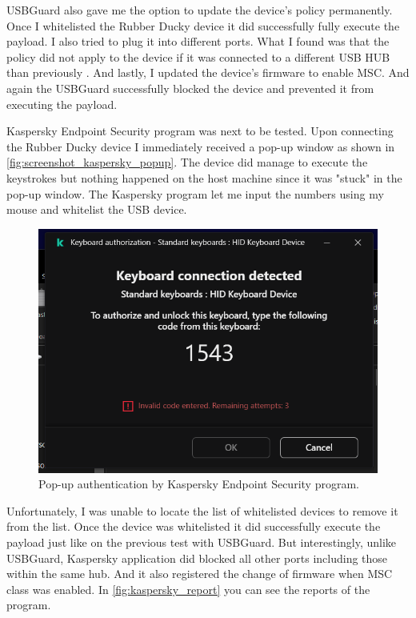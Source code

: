 USBGuard also gave me the option to update the device's policy permanently. Once I whitelisted the Rubber Ducky device it did successfully fully execute the payload. I also tried to plug it into different ports. What I found was that the policy did not apply to the device if it was connected to a different USB HUB than previously . And lastly, I updated the device's firmware to enable MSC. And again the USBGuard successfully blocked the device and prevented it from executing the payload.

Kaspersky Endpoint Security program was next to be tested. Upon connecting the Rubber Ducky device I immediately received a pop-up window as shown in \autoref{fig:screenshot_kaspersky_popup}. The device did manage to execute the keystrokes but nothing happened on the host machine since it was "stuck" in the pop-up window. The Kaspersky program let me input the numbers using my mouse and whitelist the USB device.
\begin{figure}[ht]
    \centering
    \includegraphics[width=\linewidth]{./obrazky-figures/kaspersky_keyboard_test.png}
    \caption{Pop-up authentication by Kaspersky Endpoint Security program.}
    \label{fig:screenshot_kaspersky_popup}
\end{figure}
Unfortunately, I was unable to locate the list of whitelisted devices to remove it from the list. Once the device was whitelisted it did successfully execute the payload just like on the previous test with USBGuard. But interestingly, unlike USBGuard, Kaspersky application did blocked all other ports including those within the same hub. And it also registered the change of firmware when MSC class was enabled. In \autoref{fig:kaspersky_report} you can see the reports of the program.
